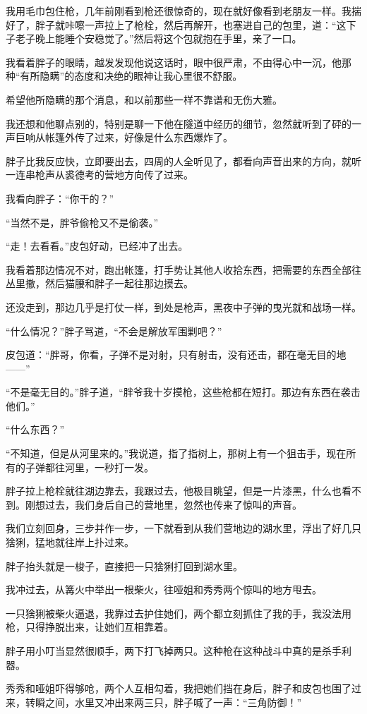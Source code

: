 我用毛巾包住枪，几年前刚看到枪还很惊奇的，现在就好像看到老朋友一样。我揣好了，胖子就咔嚓一声拉上了枪栓，然后再解开，也塞进自己的包里，道：“这下子老子晚上能睡个安稳觉了。”然后将这个包就抱在手里，亲了一口。

我看着胖子的眼睛，越发发现他说这话时，眼中很严肃，不由得心中一沉，他那种“有所隐瞒”的态度和决绝的眼神让我心里很不舒服。

希望他所隐瞒的那个消息，和以前那些一样不靠谱和无伤大雅。

我还想和他聊点别的，特别是聊一下他在隧道中经历的细节，忽然就听到了砰的一声巨响从帐篷外传了过来，好像是什么东西爆炸了。

胖子比我反应快，立即要出去，四周的人全听见了，都看向声音出来的方向，就听一连串枪声从裘德考的营地方向传了过来。

我看向胖子：“你干的？”

“当然不是，胖爷偷枪又不是偷袭。”

“走！去看看。”皮包好动，已经冲了出去。

我看着那边情况不对，跑出帐篷，打手势让其他人收拾东西，把需要的东西全部往丛里撤，然后猫腰和胖子一起往那边摸去。

还没走到，那边几乎是打仗一样，到处是枪声，黑夜中子弹的曳光就和战场一样。

“什么情况？”胖子骂道，“不会是解放军围剿吧？”

皮包道：“胖哥，你看，子弹不是对射，只有射击，没有还击，都在毫无目的地——”

“不是毫无目的。”胖子道，“胖爷我十岁摸枪，这些枪都在短打。那边有东西在袭击他们。”

“什么东西？”

“不知道，但是从河里来的。”我说道，指了指树上，那树上有一个狙击手，现在所有的子弹都往河里，一秒打一发。

胖子拉上枪栓就往湖边靠去，我跟过去，他极目眺望，但是一片漆黑，什么也看不到。刚想过去，我们身后自己的营地里，忽然也传来了惊叫的声音。

我们立刻回身，三步并作一步，一下就看到从我们营地边的湖水里，浮出了好几只猞猁，猛地就往岸上扑过来。

胖子抬头就是一梭子，直接把一只猞猁打回到湖水里。

我冲过去，从篝火中举出一根柴火，往哑姐和秀秀两个惊叫的地方甩去。

一只猞猁被柴火逼退，我靠过去护住她们，两个都立刻抓住了我的手，我没法用枪，只得挣脱出来，让她们互相靠着。

胖子用小叮当显然很顺手，两下打飞掉两只。这种枪在这种战斗中真的是杀手利器。

秀秀和哑姐吓得够呛，两个人互相勾着，我把她们挡在身后，胖子和皮包也围了过来，转瞬之间，水里又冲出来两三只，胖子喊了一声：“三角防御！”

